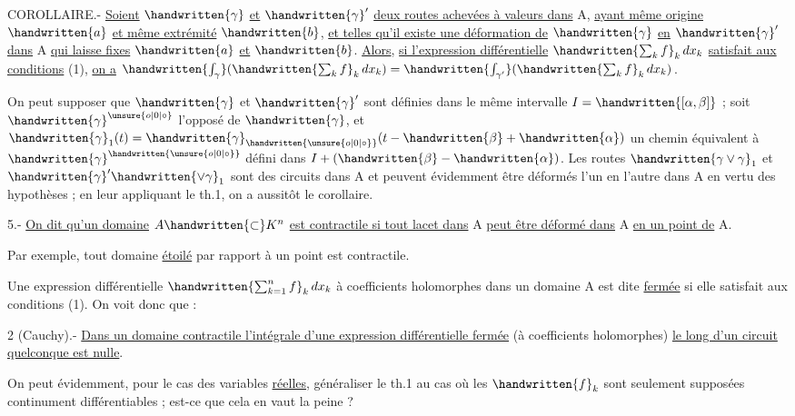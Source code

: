 
COROLLAIRE.- \uline{Soient} $\handwritten{\gamma}$ \uline{et} $\handwritten{\gamma}'$ \uline{deux routes achevées à valeurs dans} A, \uline{ayant même origine} $\handwritten{a}$ \uline{et même extrémité} $\handwritten{b}$, \uline{et telles qu'il existe une déformation de} $\handwritten{\gamma}$ \uline{en} $\handwritten{\gamma}'$ \uline{dans} A \uline{qui laisse fixes} $\handwritten{a}$ \uline{et} $\handwritten{b}$. \uline{Alors}, \uline{si l'expression différentielle} $\handwritten{\sum_k f}_k\,dx_k$ \uline{satisfait aux conditions} (1), \uline{on a} $\handwritten{\int_\gamma}(\handwritten{\sum_k f}_k\,dx_k)=\handwritten{\int_{\gamma'}}(\handwritten{\sum_k f}_k\,dx_k)$.

On peut supposer que $\handwritten{\gamma}$ et $\handwritten{\gamma}'$ sont définies dans le même intervalle $I=\handwritten{[\alpha,\beta]}$ ; soit $\handwritten{\gamma}^{\unsure{o|0|\circ}}$ l'opposé de $\handwritten{\gamma}$, et $\handwritten{\gamma}_1(t)=\handwritten{\gamma}_{\handwritten{\unsure{o|0|\circ}}}(t-\handwritten{\beta}+\handwritten{\alpha})$ un chemin équivalent à $\handwritten{\gamma}^{\handwritten{\unsure{o|0|\circ}}}$ défini dans $I+(\handwritten{\beta}-\handwritten{\alpha})$. Les routes $\handwritten{\gamma\vee\gamma}_1$ et $\handwritten{\gamma}'\handwritten{\vee\gamma}_1$ sont des circuits dans A et peuvent évidemment être déformés l'un en l'autre dans A en vertu des hypothèses ; en leur appliquant le th.1, on a aussitôt le corollaire.

 5.- \uline{On dit qu'un domaine} $A\handwritten{\subset}K^n$ \uline{est contractile si tout lacet dans} A \uline{peut être déformé dans} A \uline{en un point de} A.

Par exemple, tout domaine \uline{étoilé} par rapport à un point est contractile.

Une expression différentielle $\handwritten{\sum_{k=1}^n f}_k\,dx_k$ à coefficients holomorphes dans un domaine A est dite \uline{fermée} si elle satisfait aux conditions (1). On voit donc que :

 2 (Cauchy).- \uline{Dans un domaine contractile l'intégrale d'une expression différentielle fermée} (à coefficients holomorphes) \uline{le long d'un circuit quelconque est nulle}.

On peut évidemment, pour le cas des variables \uline{réelles}, généraliser le th.1 au cas où les $\handwritten{f}_k$ sont seulement supposées continument différentiables ; est-ce que cela en vaut la peine ?

